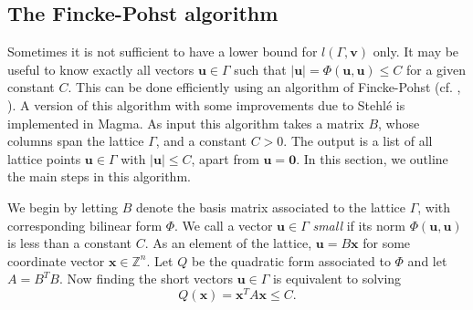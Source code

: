 
\subsection{The Fincke-Pohst algorithm}
\label{subsec:FinckePohst}

Sometimes it is not sufficient to have a lower bound for $l(\Gamma,\mathbf{v})$ only. It may be useful to know exactly all vectors $\mathbf{u} \in \Gamma$ such that $|\mathbf{u}|  = \Phi(\mathbf{u}, \mathbf{u}) \leq C$ for a given constant $C$. This can be done efficiently using an algorithm of Fincke-Pohst (cf. \cite{FP}, \cite{Coh1}). A version of this algorithm with some improvements due to Stehl\'e is implemented in Magma. As input this algorithm takes a matrix $B$, whose columns span the lattice $\Gamma$, and a constant $C > 0$. The output is a list of all lattice points $\mathbf{u} \in \Gamma$ with $|\mathbf{u}| \leq C$, apart from $\mathbf{u} = \mathbf{0}$. In this section, we outline the main steps in this algorithm. 

We begin by letting $B$ denote the basis matrix associated to the lattice $\Gamma$, with corresponding bilinear form $\Phi$. We call a vector $\mathbf{u} \in \Gamma$ \textit{small} if its norm $\Phi(\mathbf{u}, \mathbf{u})$ is less than a constant $C$. As an element of the lattice, $\mathbf{u} = B\mathbf{x}$ for some coordinate vector $\mathbf{x} \in \mathbb{Z}^n$. Let $Q$ be the quadratic form associated to $\Phi$ and let $A=B^TB$. Now finding the short vectors $\mathbf{u} \in \Gamma$ is equivalent to solving 
\begin{equation} \label{eq:ShortVector}
Q(\mathbf{x}) = \mathbf{x}^TA\mathbf{x} \leq C.
\end{equation}

